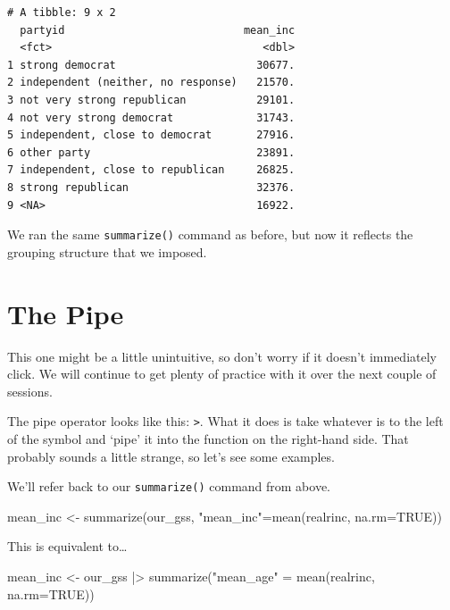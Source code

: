 \documentclass[
  letterpaper,
  DIV=11,
  numbers=noendperiod]{scrreprt}
\newenvironment{Shaded}{\begin{snugshade}}{\end{snugshade}}
\newcommand{\AttributeTok}[1]{\textcolor[rgb]{0.40,0.45,0.13}{#1}}
\newcommand{\ConstantTok}[1]{\textcolor[rgb]{0.56,0.35,0.01}{#1}}
\newcommand{\FunctionTok}[1]{\textcolor[rgb]{0.28,0.35,0.67}{#1}}
\newcommand{\NormalTok}[1]{\textcolor[rgb]{0.00,0.23,0.31}{#1}}
\newcommand{\OtherTok}[1]{\textcolor[rgb]{0.00,0.23,0.31}{#1}}
\newcommand{\SpecialCharTok}[1]{\textcolor[rgb]{0.37,0.37,0.37}{#1}}
\newcommand{\StringTok}[1]{\textcolor[rgb]{0.13,0.47,0.30}{#1}}
\begin{document}
\begin{verbatim}
# A tibble: 9 x 2
  partyid                            mean_inc
  <fct>                                 <dbl>
1 strong democrat                      30677.
2 independent (neither, no response)   21570.
3 not very strong republican           29101.
4 not very strong democrat             31743.
5 independent, close to democrat       27916.
6 other party                          23891.
7 independent, close to republican     26825.
8 strong republican                    32376.
9 <NA>                                 16922.
\end{verbatim}

We ran the same \texttt{summarize()} command as before, but now it
reflects the grouping structure that we imposed.

\section{The Pipe}\label{the-pipe}

This one might be a little unintuitive, so don't worry if it doesn't
immediately click. We will continue to get plenty of practice with it
over the next couple of sessions.

The pipe operator looks like this: \texttt{\textbar{}\textgreater{}}.
What it does is take whatever is to the left of the symbol and `pipe' it
into the function on the right-hand side. That probably sounds a little
strange, so let's see some examples.

We'll refer back to our \texttt{summarize()} command from above.

\begin{Shaded}
\begin{Highlighting}[]
\NormalTok{mean\_inc }\OtherTok{\textless{}{-}} \FunctionTok{summarize}\NormalTok{(our\_gss, }\StringTok{"mean\_inc"}\OtherTok{=}\FunctionTok{mean}\NormalTok{(realrinc, }\AttributeTok{na.rm=}\ConstantTok{TRUE}\NormalTok{))}
\end{Highlighting}
\end{Shaded}

This is equivalent to\ldots{}

\begin{Shaded}
\begin{Highlighting}[]
\NormalTok{mean\_inc }\OtherTok{\textless{}{-}}\NormalTok{ our\_gss }\SpecialCharTok{|\textgreater{}}
  \FunctionTok{summarize}\NormalTok{(}\StringTok{"mean\_age"} \OtherTok{=} \FunctionTok{mean}\NormalTok{(realrinc, }\AttributeTok{na.rm=}\ConstantTok{TRUE}\NormalTok{))}
\end{Highlighting}
\end{Shaded}
\end{document}
